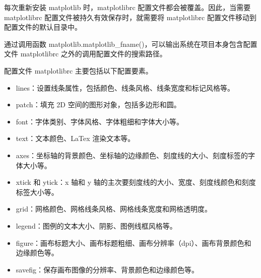 每次重新安装 matplotlib 时，matplotlibrc 配置文件都会被覆盖。因此，当需要 matplotlibrc 配置文件被持久有效保存时，就需要将 matplotlibrc 配置文件移动到配置文件的默认目录中。

通过调用函数 matplotlib.matplotlib\_fname()，可以输出系统在项目本身包含配置文件 matplotlibrc 之外的调用配置文件的搜索路径。

配置文件 matplotlibrc 主要包括以下配置要素。
\begin{itemize}
    \item lines：设置线条属性，包括颜色、线条风格、线条宽度和标记风格等。
    \item patch：填充 2D 空间的图形对象，包括多边形和圆。
    \item font：字体类别、字体风格、字体粗细和字体大小等。
    \item text：文本颜色、LaTex 渲染文本等。
    \item axes：坐标轴的背景颜色、坐标轴的边缘颜色、刻度线的大小、刻度标签的字体大小等。
    \item xtick 和 ytick：x 轴和 y 轴的主次要刻度线的大小、宽度、刻度线颜色和刻度标签大小等。
    \item grid：网格颜色、网格线条风格、网格线条宽度和网格透明度。
    \item legend：图例的文本大小、阴影、图例线框风格等。
    \item figure：画布标题大小、画布标题粗细、画布分辨率（dpi）、画布背景颜色和边缘颜色等。
    \item savefig：保存画布图像的分辨率、背景颜色和边缘颜色等。
\end{itemize}